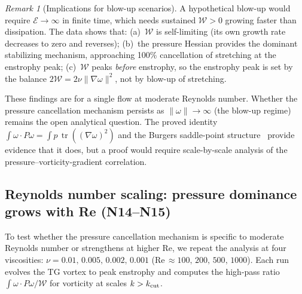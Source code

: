 \documentclass[11pt,a4paper]{article}
\theoremstyle{plain}
\theoremstyle{definition}
\theoremstyle{remark}
\newtheorem{remark}[theorem]{Remark}
\DeclareMathOperator{\tr}{tr}
\begin{document}
\begin{remark}[Implications for blow-up scenarios]
\label{rem:blowup-implications}
A hypothetical blow-up would require
$\mathcal{E}\to\infty$ in finite time, which
needs sustained $\mathcal{W}>0$ growing faster
than dissipation.  The data shows that:
(a)~$\mathcal{W}$ is self-limiting (its own growth
rate decreases to zero and reverses);
(b)~the pressure Hessian provides the dominant
stabilizing mechanism, approaching 100\%
cancellation of stretching at the enstrophy peak;
(c)~$\mathcal{W}$ peaks \emph{before} enstrophy,
so the enstrophy peak is set by the balance
$2\mathcal{W} = 2\nu\|\nabla\omega\|^2$, not by
blow-up of stretching.

These findings are for a single flow at moderate
Reynolds number.  Whether the pressure cancellation
mechanism persists as $\|\omega\|\to\infty$ (the
blow-up regime) remains the open analytical
question.  The proved identity
$\int\omega\cdot P\omega
= \int p\,\tr((\nabla\omega)^2)$ and the Burgers
saddle-point structure~\cite{Fontes2026burgers}
provide evidence that it does, but a proof would
require scale-by-scale analysis of the
pressure--vorticity-gradient correlation.
\end{remark}

\subsection{Reynolds number scaling:
pressure dominance grows with Re (N14--N15)}

To test whether the pressure cancellation
mechanism is specific to moderate Reynolds
number or strengthens at higher Re, we repeat
the analysis at four viscosities:
$\nu=0.01,\,0.005,\,0.002,\,0.001$
(Re$\,\approx 100,\,200,\,500,\,1000$).
Each run evolves the TG vortex to peak enstrophy
and computes the high-pass ratio
$\int\omega\cdot P\omega/\mathcal{W}$ for
vorticity at scales $k>k_{\rm cut}$.
\end{document}

